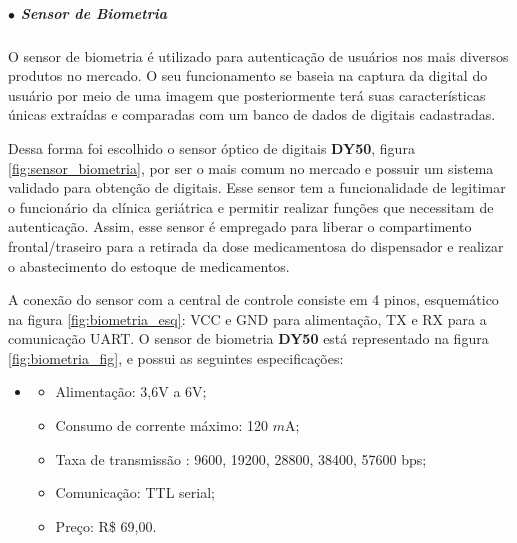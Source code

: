     \subparagraph*{$\bullet$ Sensor de Biometria} \hfill
    
    O sensor de biometria é utilizado para autenticação de usuários nos mais diversos produtos no mercado. O seu funcionamento se baseia na captura da digital do usuário por meio de uma imagem que posteriormente terá suas características únicas extraídas e comparadas com um banco de dados de digitais cadastradas. 
    
    Dessa forma foi escolhido o sensor óptico de digitais \textbf{DY50}, figura \ref{fig:sensor_biometria}, por ser o mais comum no mercado e possuir um sistema  validado para obtenção de digitais. Esse sensor tem a funcionalidade de legitimar o funcionário da clínica geriátrica e permitir realizar funções que necessitam de autenticação. Assim, esse sensor é empregado para liberar o compartimento frontal/traseiro para a retirada da dose medicamentosa do dispensador e realizar o abastecimento do estoque de medicamentos.
    
   A conexão do sensor com a central de controle consiste em 4 pinos, esquemático na figura \ref{fig:biometria_esq}: VCC e GND para alimentação, TX e RX para a comunicação UART. O sensor de biometria \textbf{DY50} está representado na figura \ref{fig:biometria_fig}, e possui as seguintes especificações:
    
    \begin{itemize}
    \item[ ]
        \begin{itemize}
            \item Alimentação: 3,6V a 6V;
            \item Consumo de corrente máximo: 120 $m$A;
            \item Taxa de transmissão : 9600, 19200, 28800, 38400, 57600 bps;
            \item Comunicação: TTL serial;
            \item Preço: R\$ 69,00.
        \end{itemize}
    \end{itemize} 
    
